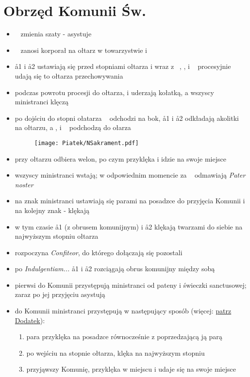 \section{Obrzęd Komunii Św.}

\begin{itemize}
   \item \ii~ zmienia szaty - asystuje 
   \item \ii~ zanosi korporał na ołtarz w towarzystwie  i 
   \item \aa1 i \aa2 ustawiają się przed stopniami ołtarza i wraz z \oo~, ,
          i \ii~ procesyjnie udają się to ołtarza przechowywania
   \item podczas powrotu procesji do ołtarza,  i  uderzają kołatką, a
         wszyscy ministranci klęczą
   \item po dojściu do stopni ołatarza \oo~ odchodzi na bok, \aa1 i \aa2
         odkładają akolitki na ołtarzu, a ,  i \ii~ podchodzą do ołarza

         \begin{figure}[h]
            \centering
            \texttt{[image: Piatek/NSakrament.pdf]}
         \end{figure}

   \item przy ołtarzu  odbiera welon, po czym przyklęka i idzie na swoje
         miejsce
   \item wszyscy ministranci wstają; w odpowiednim momencie za \ii~ odmawiają \textit{Pater noster}
   \item na znak  ministranci ustawiają się parami na posadzce do przyjęcia
         Komunii i na kolejny znak - klękają
   \item w tym czasie \aa1 (z obrusem komunijnym) i \aa2 klękają twarzami do
         siebie na najwyższym stopniu ołtarza
   \item {} rozpoczyna \textit{Confiteor}, do którego dołączają się pozostali
   \item po \textit{Indulgentiam...} \aa1 i \aa2 rozciągają obrus komunijny
         między sobą
   \item pierwsi do Komunii przystępują ministranci od pateny i świeczki
         sanctusowej; zaraz po jej przyjęciu asystują \ii~
   \item do Komunii ministranci przystępują w następujący sposób (więcej:
         \hyperref[komunia]{patrz Dodatek}):

         \begin{enumerate}[leftmargin=1cm]
            \item para przyklęka na posadzce równocześnie z poprzedzającą ją
                  parą
            \item po wejściu na stopnie ołtarza, klęka na najwyższym stopniu
            \item przyjąwszy Komunię, przyklęka w miejscu i udaje się na swoje
                  miejsce
         \end{enumerate}


\end{itemize}
